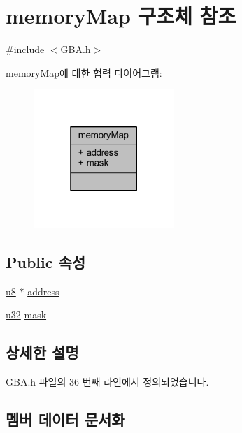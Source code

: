 \hypertarget{structmemory_map}{}\section{memory\+Map 구조체 참조}
\label{structmemory_map}


{\ttfamily \#include $<$G\+B\+A.\+h$>$}



memory\+Map에 대한 협력 다이어그램\+:\nopagebreak
\begin{figure}[H]
\begin{center}
\leavevmode
\includegraphics[width=151pt]{structmemory_map__coll__graph}
\end{center}
\end{figure}
\subsection*{Public 속성}
\begin{DoxyCompactItemize}
\item 
\mbox{\hyperlink{_system_8h_aed742c436da53c1080638ce6ef7d13de}{u8}} $\ast$ \mbox{\hyperlink{structmemory_map_ae1937ce06d98a959b8d8d5a9c1642f37}{address}}
\item 
\mbox{\hyperlink{_system_8h_a10e94b422ef0c20dcdec20d31a1f5049}{u32}} \mbox{\hyperlink{structmemory_map_ad1fc74c431f99d7fe2fbad6d199cfdc0}{mask}}
\end{DoxyCompactItemize}


\subsection{상세한 설명}


G\+B\+A.\+h 파일의 36 번째 라인에서 정의되었습니다.



\subsection{멤버 데이터 문서화}
\mbox{\label{structmemory_map_ae1937ce06d98a959b8d8d5a9c1642f37}} 

